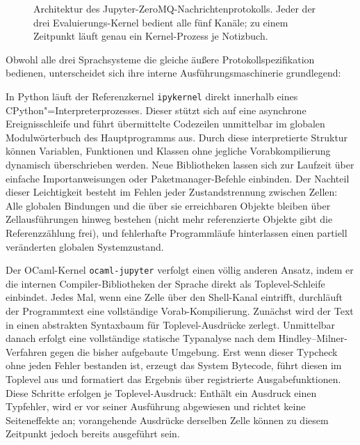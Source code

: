 \begin{figure}[htbp]
{%
  }
  \caption[Architektur des Jupyter-ZeroMQ-Nachrichtenprotokolls]{Architektur des Jupyter-ZeroMQ-Nachrichtenprotokolls.
  Jeder der drei Evaluierungs-Kernel bedient alle fünf Kanäle; zu einem Zeitpunkt läuft genau ein Kernel-Prozess je Notizbuch.}
  \label{fig:jupyter_zeromq_architecture}
\end{figure}

Obwohl alle drei Sprachsysteme die gleiche äußere Protokollspezifikation bedienen, unterscheidet sich ihre interne Ausführungsmaschinerie grundlegend:

In Python läuft der Referenzkernel \texttt{ipykernel} direkt innerhalb eines CPython"=Interpreterprozesses.
Dieser stützt sich auf eine asynchrone Ereignisschleife und führt übermittelte Codezeilen unmittelbar im globalen Modulwörterbuch des Hauptprogramms aus.
Durch diese interpretierte Struktur können Variablen, Funktionen und Klassen ohne jegliche Vorabkompilierung dynamisch überschrieben werden.
Neue Bibliotheken lassen sich zur Laufzeit über einfache Importanweisungen oder Paketmanager-Befehle einbinden.
Der Nachteil dieser Leichtigkeit besteht im Fehlen jeder Zustandstrennung zwischen Zellen: Alle globalen Bindungen und die über sie erreichbaren Objekte bleiben über Zellausführungen hinweg bestehen (nicht mehr referenzierte Objekte gibt die Referenzzählung frei), und fehlerhafte Programmläufe hinterlassen einen partiell veränderten globalen Systemzustand.

Der OCaml-Kernel \texttt{ocaml-jupyter} verfolgt einen völlig anderen Ansatz, indem er die internen Compiler-Bibliotheken der Sprache direkt als Toplevel-Schleife einbindet.
Jedes Mal, wenn eine Zelle über den Shell-Kanal eintrifft, durchläuft der Programmtext eine vollständige Vorab-Kompilierung.
Zunächst wird der Text in einen abstrakten Syntaxbaum für Toplevel-Ausdrücke zerlegt.
Unmittelbar danach erfolgt eine vollständige statische Typanalyse nach dem Hindley--Milner-Verfahren gegen die bisher aufgebaute Umgebung.
Erst wenn dieser Typcheck ohne jeden Fehler bestanden ist, erzeugt das System Bytecode, führt diesen im Toplevel aus und formatiert das Ergebnis über registrierte Ausgabefunktionen.
Diese Schritte erfolgen je Toplevel-Ausdruck: Enthält ein Ausdruck einen Typfehler, wird er vor seiner Ausführung abgewiesen und richtet keine Seiteneffekte an; vorangehende Ausdrücke derselben Zelle können zu diesem Zeitpunkt jedoch bereits ausgeführt sein.


